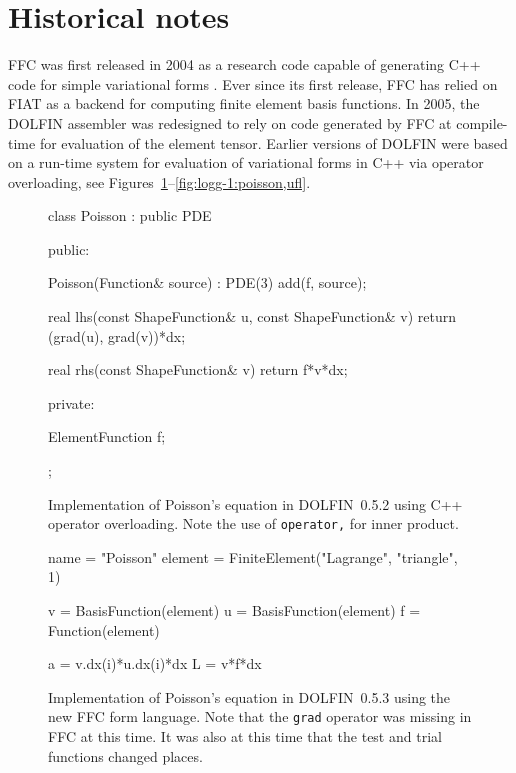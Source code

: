 \section{Historical notes}

FFC was first released in 2004 as a research code capable of
generating C++ code for simple variational forms
\citep{KirbyLogg2006,KirbyLogg2007}. Ever since its first release,
FFC has relied on FIAT as a backend for computing finite element basis
functions. In 2005, the DOLFIN assembler was redesigned to rely on
code generated by FFC at compile-time for evaluation of the element
tensor. Earlier versions of DOLFIN were based on a run-time system for
evaluation of variational forms in C++ via operator overloading, see
Figures~\ref{fig:logg-1:poisson,before}--\ref{fig:logg-1:poisson,ufl}.

\begin{figure}
  \begin{center}
\begin{c++}
class Poisson : public PDE
{
public:

  Poisson(Function& source) : PDE(3)
  {
    add(f, source);
  }

  real lhs(const ShapeFunction& u,
           const ShapeFunction& v)
  {
    return (grad(u), grad(v))*dx;
  }

  real rhs(const ShapeFunction& v)
  {
    return f*v*dx;
  }

private:

  ElementFunction f;

};
\end{c++}
  \caption{Implementation of Poisson's equation in DOLFIN~0.5.2 using C++ operator overloading.
           Note the use of \texttt{operator,} for inner product.}
  \label{fig:logg-1:poisson,before}
  \end{center}
\end{figure}

\begin{figure}
  \begin{center}
\begin{python}
name = "Poisson"
element = FiniteElement("Lagrange", "triangle", 1)

v = BasisFunction(element)
u = BasisFunction(element)
f = Function(element)

a = v.dx(i)*u.dx(i)*dx
L = v*f*dx
\end{python}
\caption{Implementation of Poisson's equation in DOLFIN~0.5.3 using
  the new FFC form language. Note that the \texttt{grad} operator
  was missing in FFC at this time. It was also at this time that the
  test and trial functions changed places.}
\label{fig:logg-1:poisson,after}
  \end{center}
\end{figure}

